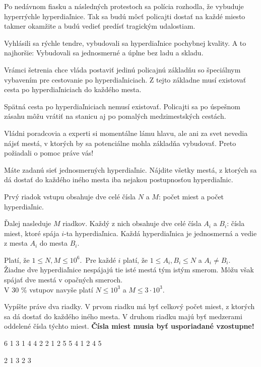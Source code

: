 





Po nedávnom fiasku a následných protestoch sa polícia rozhodla, že vybuduje
hyperrýchle hyperdiaľnice. Tak sa budú môcť policajti dostať na každé miesto takmer
okamžite a budú vedieť predísť tragickým udalostiam.

Vyhlásili sa rýchle tendre, vybudovali sa hyperdiaľnice pochybnej kvality. A to
najhoršie: Vybudovali sa jednosmerné a úplne bez ladu a skladu.

Vrámci šetrenia chce vláda postaviť jedinú policajnú základňu so špeciálnym
vybavením pre cestovanie po hyperdiaľniciach. Z tejto základne musí existovať
cesta po hyperdiaľniciach do každého mesta.

Spätná cesta po hyperdiaľniciach nemusí existovať. Policajti sa po úspešnom
zásahu môžu vrátiť na stanicu aj po pomalých medzimestských cestách.

Vládni poradcovia a experti si momentálne lámu hlavu, ale ani za svet nevedia
nájsť mestá, v ktorých by sa potenciálne mohla základňa vybudovať. Preto požiadali
o pomoc práve vás!


Máte zadanú sieť jednosmerných hyperdiaľnic. Nájdite všetky mestá, z ktorých
sa dá dostať do každého iného mesta iba nejakou postupnosťou hyperdiaľnic.


Prvý riadok vstupu obsahuje dve celé čísla $N$ a $M$: počet miest a počet
hyperdiaľnic.

Ďalej nasleduje $M$ riadkov. Každý z nich obsahuje dve celé čísla $A_i$ a $B_i$:
čísla miest, ktoré spája $i$-ta hyperdiaľnica. Každá hyperdiaľnica je jednosmerná a vedie
z mesta $A_i$ do mesta $B_i$.

\bigskip
\noindent
Platí, že $1 \leq N, M \leq 10^6$.\
Pre každé $i$ platí, že $1 \leq A_i, B_i \leq N$ a $A_i \neq B_i$.\\
Žiadne dve hyperdiaľnice nespájajú tie isté mestá tým istým smerom. Môžu však
spájať dve mestá v opačných smeroch. \\
V 30 \% vstupov navyše platí $N \leq 10^3$ a $M \leq 3 \cdot 10^3$.


Vypíšte práve dva riadky. V prvom riadku má byť celkový počet miest, z ktorých
sa dá dostať do každého iného mesta. V druhom riadku majú byť medzerami oddelené
čísla týchto miest. \textbf{Čísla miest musia byť usporiadané vzostupne!}


 6
1 3
1 4
4 2
2 1
2 5
5 4
1 2 4 5
\sampleEND

 2
1 3
2 3
~
\sampleEND


